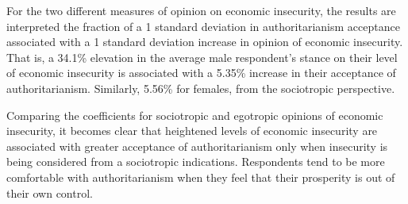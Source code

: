 \documentclass[11pt]{article}
\begin{document}
For the two different measures of opinion on economic insecurity, the results are interpreted the fraction of a 1 standard deviation in authoritarianism acceptance associated with a 1 standard deviation increase in opinion of economic insecurity. That is, a 34.1\% elevation in the average male respondent's stance on their level of economic insecurity is associated with a 5.35\% increase in their acceptance of authoritarianism. Similarly, 5.56\% for females, from the sociotropic perspective. 

Comparing the coefficients for sociotropic and egotropic opinions of economic insecurity, it becomes clear that heightened levels of economic insecurity are associated with greater acceptance of authoritarianism only when insecurity is being considered from a sociotropic indications. Respondents tend to be more comfortable with authoritarianism when they feel that their prosperity is out of their own control.  

     
\end{document}
